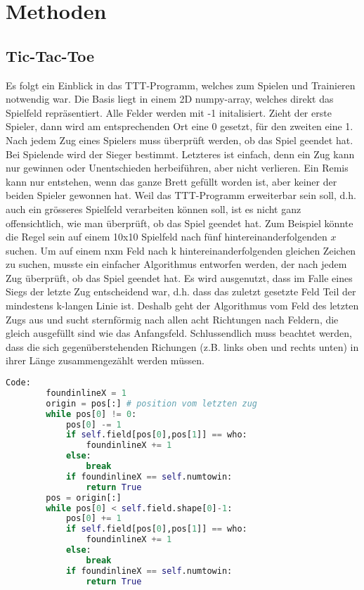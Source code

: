 \documentclass[12pt,a4paper]{article}
\begin{document}
\newpage
\section{Methoden}
\subsection{Tic-Tac-Toe}
Es folgt ein Einblick in das TTT-Programm, welches zum Spielen und Trainieren notwendig war. 
Die Basis liegt in einem 2D numpy-array, welches direkt das Spielfeld repräsentiert. Alle Felder werden mit -1 initalisiert. Zieht der erste Spieler, dann wird am entsprechenden Ort eine 0 gesetzt, für den zweiten eine 1.
Nach jedem Zug eines Spielers muss überprüft werden, ob das Spiel geendet hat. Bei Spielende wird der Sieger bestimmt. Letzteres ist einfach, denn ein Zug kann nur gewinnen oder Unentschieden herbeiführen, aber nicht verlieren. Ein Remis kann nur entstehen, wenn das ganze Brett gefüllt worden ist, aber keiner der beiden Spieler gewonnen hat.
Weil das TTT-Programm erweiterbar sein soll, d.h. auch ein grösseres Spielfeld verarbeiten können soll, ist es nicht ganz offensichtlich, wie man überprüft, ob das Spiel geendet hat. Zum Beispiel könnte die Regel sein auf einem 10x10 Spielfeld nach fünf hintereinanderfolgenden $x$ suchen.
Um auf einem nxm Feld nach k hintereinanderfolgenden gleichen Zeichen zu suchen, musste ein einfacher Algorithmus entworfen werden, der nach jedem Zug überprüft, ob das Spiel geendet hat. 
Es wird ausgenutzt, dass im Falle eines Siegs der letzte Zug entscheidend war, d.h. dass das zuletzt gesetzte Feld Teil der mindestens k-langen Linie ist. Deshalb geht der Algorithmus vom Feld des letzten Zugs aus und sucht sternförmig nach allen acht Richtungen nach Feldern, die gleich ausgefüllt sind wie das Anfangsfeld. Schlussendlich muss beachtet werden, dass die sich gegenüberstehenden Richungen (z.B. links oben und rechts unten) in ihrer Länge zusammengezählt werden müssen.
\begin{singlespace}
\begin{lstlisting}[language=Python,caption={Code, der nach Lösungen in der Horizontale sucht},captionpos=b]
	Code:
        foundinlineX = 1        
        origin = pos[:] # position vom letzten zug
        while pos[0] != 0:
            pos[0] -= 1
            if self.field[pos[0],pos[1]] == who:
                foundinlineX += 1
            else:
                break
            if foundinlineX == self.numtowin:
                return True
        pos = origin[:]
        while pos[0] < self.field.shape[0]-1:
            pos[0] += 1
            if self.field[pos[0],pos[1]] == who:
                foundinlineX += 1
            else:
                break
            if foundinlineX == self.numtowin:
                return True

\end{lstlisting}
\end{singlespace}
\end{document}
